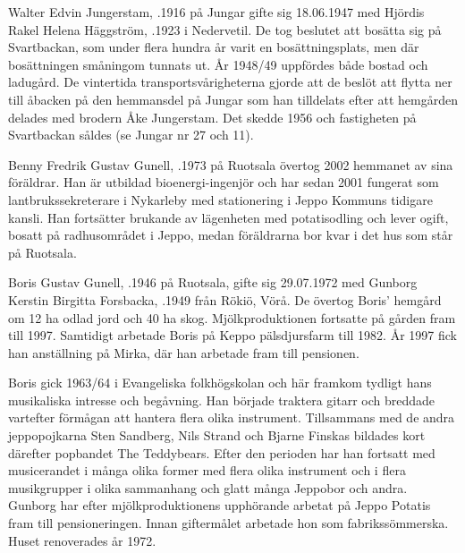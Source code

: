 %
Walter Edvin Jungerstam, .1916 på Jungar gifte sig 18.06.1947 med Hjördis Rakel Helena Häggström, .1923 i Nedervetil. De tog beslutet att bosätta sig på Svartbackan, som under flera hundra år varit en bosättningsplats, men där bosättningen småningom tunnats ut. År 1948/49 uppfördes både bostad och ladugård. De vintertida
transportsvårigheterna gjorde att de beslöt att flytta ner till åbacken på den hemmansdel på Jungar som han tilldelats efter att hemgården delades med brodern Åke Jungerstam. Det skedde 1956 och fastigheten på Svartbackan såldes (se Jungar nr 27 och 11).



%



%
Benny Fredrik Gustav Gunell, .1973 på Ruotsala övertog 2002 hemmanet av sina föräldrar. Han är utbildad bioenergi-ingenjör och har sedan 2001 fungerat som lantbrukssekreterare i Nykarleby med stationering i Jeppo Kommuns tidigare kansli. Han fortsätter brukande av lägenheten med potatisodling  och lever ogift, bosatt på radhusområdet i Jeppo, medan föräldrarna bor kvar i det hus som står på Ruotsala.


%
Boris Gustav Gunell, .1946 på Ruotsala, gifte sig 29.07.1972 med Gunborg Kerstin Birgitta Forsbacka, .1949 från Rökiö, Vörå. De övertog Boris' hemgård om 12 ha odlad jord och 40 ha skog. Mjölkproduktionen fortsatte på gården fram till 1997. Samtidigt arbetade Boris på Keppo pälsdjursfarm till 1982. År 1997 fick han anställning på Mirka, där han arbetade fram till pensionen.

Boris gick 1963/64 i Evangeliska folkhögskolan och här framkom tydligt hans musikaliska intresse och begåvning. Han började traktera gitarr och breddade vartefter förmågan att hantera flera olika instrument. Tillsammans med de andra jeppopojkarna Sten Sandberg, Nils Strand och Bjarne Finskas bildades kort därefter popbandet The Teddybears. Efter den perioden har han fortsatt med musicerandet i många	olika former med flera olika instrument och i flera musikgrupper i olika sammanhang och glatt många Jeppobor och andra. Gunborg har efter mjölkproduktionens upphörande arbetat på Jeppo Potatis fram till pensioneringen. Innan giftermålet arbetade hon som fabrikssömmerska. Huset renoverades år 1972.
\begin{jhchildren}
  \item {}
  \item {}
\end{jhchildren}


